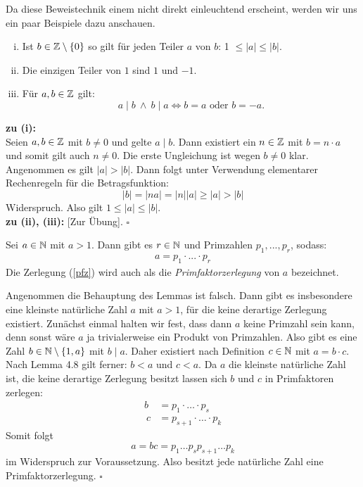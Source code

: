 Da diese Beweistechnik einem nicht direkt einleuchtend erscheint, werden wir
uns ein paar Beispiele dazu anschauen.

\begin{lemma}
\begin{enumerate}[(i)]
\item Ist $b \in \mathbb{Z} \setminus \{0\}$ so gilt für jeden Teiler $a$ von $b$:
1 $\leq \lvert a \rvert \leq \lvert b \rvert$.

\item Die einzigen Teiler von $1$ sind $1$ und $-1$.

\item Für $a,b \in \mathbb{Z}$ gilt:
\[
  a \mid b \ \wedge \ b \mid a \iff b = a \text{ oder } b = -a.
\]
\end{enumerate}
\end{lemma}

\begin{proof*}
\textbf{zu (i):}\\
Seien $a,b \in \mathbb{Z}$ mit $b \neq 0$ und gelte $a \mid b$.
Dann existiert ein $n \in \mathbb{Z}$ mit $b = n \cdot a$ und somit gilt auch $n \neq 0$.
Die erste Ungleichung ist wegen $b \neq 0$ klar.
Angenommen es gilt $\lvert a \rvert > \lvert b \rvert$.
Dann folgt unter Verwendung elementarer Rechenregeln für die Betragsfunktion:
\[
  \lvert b \rvert = \lvert n a \rvert = \lvert n \rvert \lvert a \rvert
  \geq \lvert a \rvert > \lvert b \rvert
\]
Widerspruch.
Also gilt $1 \leq \lvert a \rvert \leq \lvert b \rvert$.\\
\textbf{zu (ii), (iii):} [Zur Übung].
\hfill $\square$
\end{proof*}


\begin{lemma}
Sei $a \in \mathbb{N}$ mit $a > 1$.
Dann gibt es $r \in \mathbb{N}$ und Primzahlen $p_1,...,p_r$, sodass:
\begin{align}
    a = p_1 \cdot ... \cdot p_r \label{pfz}
\end{align}
Die Zerlegung (\ref{pfz}) wird auch als die \textit{Primfaktorzerlegung} von
$a$ bezeichnet.
\end{lemma}


\begin{proof*}%
Angenommen die Behauptung des Lemmas ist falsch.
Dann gibt es insbesondere eine kleinste natürliche Zahl $a$ mit $a>1$,
für die keine derartige Zerlegung existiert.
Zunächst einmal halten wir fest, dass dann $a$ keine Primzahl sein kann,
denn sonst wäre $a$ ja trivialerweise ein Produkt von Primzahlen.
Also gibt es eine Zahl $b \in \mathbb{N} \setminus \{1,a\}$ mit $b \mid a$.
Daher existiert nach Definition $c \in \mathbb{N}$ mit $a = b \cdot c$.
Nach Lemma 4.8 gilt ferner:
$b < a$ und $c < a$. Da $a$ die kleinste natürliche Zahl ist, die keine
derartige Zerlegung besitzt lassen sich $b$ und $c$ in Primfaktoren zerlegen:
\begin{align*}
    b &= p_1 \cdot \ldots \cdot p_s \\\
    c &= p_{s+1} \cdot \ldots \cdot p_k
\end{align*}
Somit folgt
\[
    a = b c = p_1 \ldots p_s p_{s+1} \ldots p_k
\]
im Widerspruch zur Voraussetzung.
Also besitzt jede natürliche Zahl eine Primfaktorzerlegung.
\hfill $\square$
\end{proof*}


